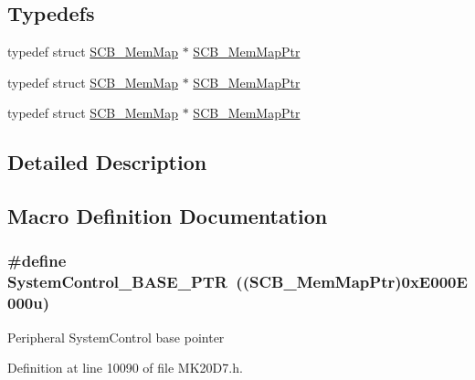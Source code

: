 \subsection*{Typedefs}
\begin{DoxyCompactItemize}
\item 
typedef struct \hyperlink{struct_s_c_b___mem_map}{S\+C\+B\+\_\+\+Mem\+Map} $\ast$ \hyperlink{group___s_c_b___peripheral_ga08aca299c99cac47121d9e64e7b8e1cf}{S\+C\+B\+\_\+\+Mem\+Map\+Ptr}
\item 
typedef struct \hyperlink{struct_s_c_b___mem_map}{S\+C\+B\+\_\+\+Mem\+Map} $\ast$ \hyperlink{group___s_c_b___peripheral_ga08aca299c99cac47121d9e64e7b8e1cf}{S\+C\+B\+\_\+\+Mem\+Map\+Ptr}
\item 
typedef struct \hyperlink{struct_s_c_b___mem_map}{S\+C\+B\+\_\+\+Mem\+Map} $\ast$ \hyperlink{group___s_c_b___peripheral_ga08aca299c99cac47121d9e64e7b8e1cf}{S\+C\+B\+\_\+\+Mem\+Map\+Ptr}
\end{DoxyCompactItemize}


\subsection{Detailed Description}


\subsection{Macro Definition Documentation}
\subsubsection[{\texorpdfstring{System\+Control\+\_\+\+B\+A\+S\+E\+\_\+\+P\+TR}{SystemControl_BASE_PTR}}]{\setlength{\rightskip}{0pt plus 5cm}\#define System\+Control\+\_\+\+B\+A\+S\+E\+\_\+\+P\+TR~(({\bf S\+C\+B\+\_\+\+Mem\+Map\+Ptr})0x\+E000\+E000u)}\hypertarget{group___s_c_b___peripheral_gaf22864785770f832103e904244e078cb}{}\label{group___s_c_b___peripheral_gaf22864785770f832103e904244e078cb}
Peripheral System\+Control base pointer 

Definition at line 10090 of file M\+K20\+D7.\+h.

